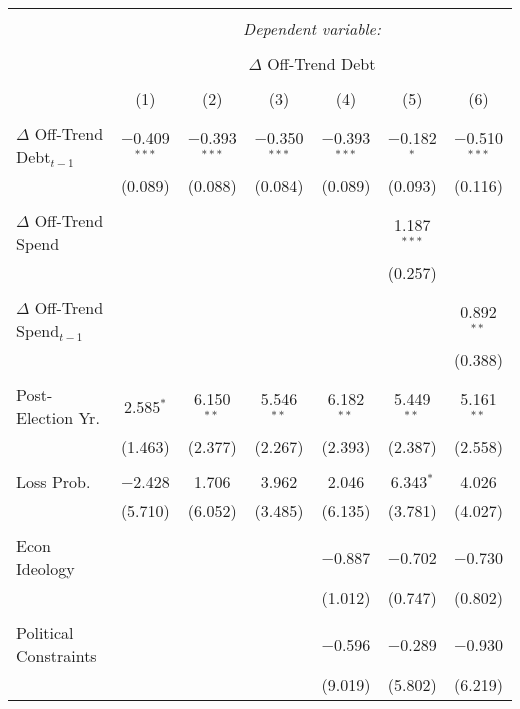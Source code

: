 
\begingroup 
\tiny 
\begin{tabular}{@{\extracolsep{5pt}}lcccccc} 
\\[-1.8ex]\hline 
\hline \\[-1.8ex] 
 & \multicolumn{6}{c}{\textit{Dependent variable:}} \\ 
\cline{2-7} 
\\[-1.8ex] & \multicolumn{6}{c}{$\Delta$ Off-Trend Debt} \\ 
\\[-1.8ex] & (1) & (2) & (3) & (4) & (5) & (6)\\ 
\hline \\[-1.8ex] 
 $\Delta$ Off-Trend Debt$_{t-1}$ & $-$0.409$^{***}$ & $-$0.393$^{***}$ & $-$0.350$^{***}$ & $-$0.393$^{***}$ & $-$0.182$^{*}$ & $-$0.510$^{***}$ \\ 
  & (0.089) & (0.088) & (0.084) & (0.089) & (0.093) & (0.116) \\ 
  & & & & & & \\ 
 $\Delta$ Off-Trend Spend &  &  &  &  & 1.187$^{***}$ &  \\ 
  &  &  &  &  & (0.257) &  \\ 
  & & & & & & \\ 
 $\Delta$ Off-Trend Spend$_{t-1}$ &  &  &  &  &  & 0.892$^{**}$ \\ 
  &  &  &  &  &  & (0.388) \\ 
  & & & & & & \\ 
 Post-Election Yr. & 2.585$^{*}$ & 6.150$^{**}$ & 5.546$^{**}$ & 6.182$^{**}$ & 5.449$^{**}$ & 5.161$^{**}$ \\ 
  & (1.463) & (2.377) & (2.267) & (2.393) & (2.387) & (2.558) \\ 
  & & & & & & \\ 
 Loss Prob. & $-$2.428 & 1.706 & 3.962 & 2.046 & 6.343$^{*}$ & 4.026 \\ 
  & (5.710) & (6.052) & (3.485) & (6.135) & (3.781) & (4.027) \\ 
  & & & & & & \\ 
 Econ Ideology &  &  &  & $-$0.887 & $-$0.702 & $-$0.730 \\ 
  &  &  &  & (1.012) & (0.747) & (0.802) \\ 
  & & & & & & \\ 
 Political Constraints &  &  &  & $-$0.596 & $-$0.289 & $-$0.930 \\ 
  &  &  &  & (9.019) & (5.802) & (6.219) \\ 

\end{tabular}
